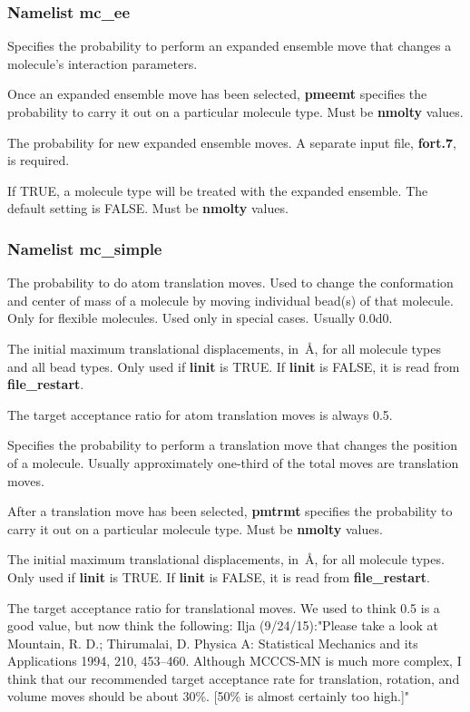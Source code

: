 \documentclass[12pt,letterpaper]{article}
\begin{document}
\subsubsection{Namelist \textbf{mc\_ee}}
 Specifies the probability to perform
an expanded ensemble move that changes a molecule's
interaction parameters.

 Once an expanded ensemble move has
been selected, {\bf pmeemt} specifies the probability to
carry it out on a particular molecule type. Must be {\bf
  nmolty} values.

 The probability for new expanded
ensemble moves. A separate input file, {\bf fort.7}, is
required.

 If TRUE, a molecule type will be
treated with the expanded ensemble. The default setting is
FALSE. Must be {\bf nmolty} values.

\subsubsection{Namelist \textbf{mc\_simple}}
 The probability to do atom
translation moves. Used to change the conformation and
center of mass of a molecule by moving individual bead(s) of
that molecule. Only for flexible molecules. Used only in
special cases. Usually 0.0d0.

 The initial maximum translational
displacements, in~\AA, for all molecule types and all bead
types. Only used if {\bf linit} is TRUE. If {\bf linit} is
FALSE, it is read from {\bf file\_restart}.

\noindent The target acceptance ratio for atom translation
moves is always 0.5.

 Specifies the probability to perform a
translation move that changes the position of a molecule.
Usually approximately one-third of the total moves are
translation moves.

 After a translation move has been
selected, {\bf pmtrmt} specifies the probability to carry it
out on a particular molecule type. Must be {\bf nmolty}
values.

 The initial maximum translational
displacements, in~\AA, for all molecule types. Only used if
{\bf linit} is TRUE. If {\bf linit} is FALSE, it is read
from {\bf file\_restart}.

 The target acceptance ratio for
translational moves. We used to think 0.5 is a good value, 
but now think the following:
Ilja (9/24/15):"Please take a look at 
Mountain, R. D.; Thirumalai, D. Physica A: Statistical Mechanics and its Applications
1994, 210, 453–460.
Although MCCCS-MN is much more complex, I think that our
recommended target acceptance rate for translation, rotation,
and volume moves should be about 30\%.  [50\% is almost certainly too high.]"
\end{document}
